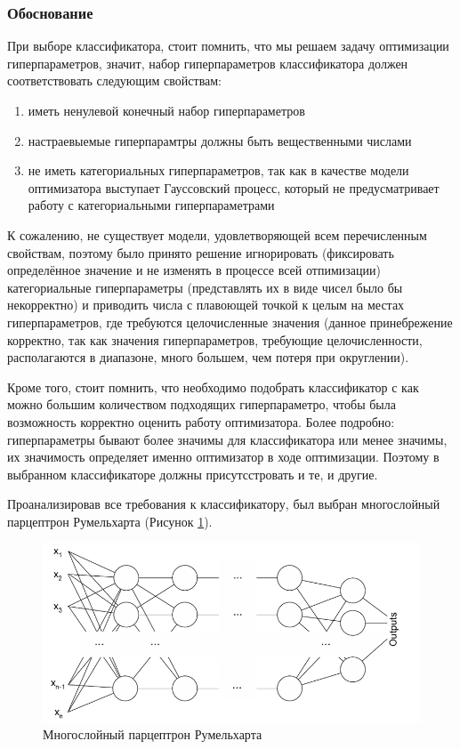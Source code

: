 \documentclass[times,specification,annotation]{itmo-student-thesis}
\begin{document}
		\subsubsection{Обоснование}
		При выборе классификатора, стоит помнить, что мы решаем задачу оптимизации гиперпараметров, значит, набор гиперпараметров классификатора должен соответствовать следующим свойствам: 
		\begin{enumerate}
			\item иметь ненулевой конечный набор гиперпараметров
			\item настраевыемые гиперпарамтры должны быть вещественными числами
			\item не иметь категориальных гиперпараметров, так как в качестве модели оптимизатора выступает Гауссовский процесс, который не предусматривает работу с категориальными гиперпараметрами
		\end{enumerate}
		К сожалению, не существует модели, удовлетворяющей всем перечисленным свойствам, поэтому было принято решение игнорировать (фиксировать определённое значение и не изменять в процессе всей отпимизации) категориальные гиперпараметры (представлять их в виде чисел было бы некорректно) и приводить числа с плавоющей точкой к целым на местах гиперпараметров, где требуются целочисленные значения (данное принебрежение корректно, так как значения гиперпараметров, требующие целочисленности, располагаются в диапазоне, много большем, чем потеря при округлении).\par
		Кроме того, стоит помнить, что необходимо подобрать классификатор с как можно большим количеством подходящих гиперпараметро, чтобы была возможность корректно оценить работу оптимизатора. Более подробно: гиперпараметры бывают более значимы для классификатора или менее значимы, их значимость определяет именно оптимизатор в ходе оптимизации. Поэтому в выбранном классификаторе должны присутсстровать и те, и другие.\par
		Проанализировав все требования к классификатору, был выбран многослойный парцептрон Румельхарта (Рисунок \ref{img:parceptron}).
		\begin{figure}[!ht]
			\caption{Многослойный парцептрон Румельхарта}\label{img:parceptron}
			\includegraphics[width=0.65\linewidth]{parceptrone}
			\centering
		\end{figure}
\end{document}
